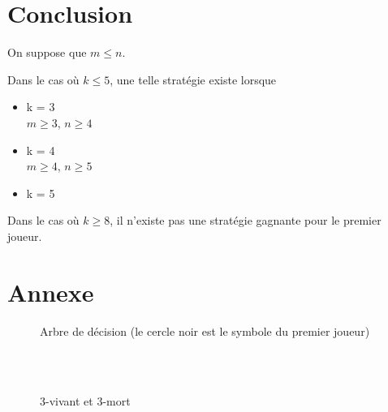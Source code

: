\documentclass{beamer}
\begin{document}
\section{Conclusion}
On suppose que $m \le n$.\par
Dans le cas où $k \le 5$, une telle stratégie existe lorsque
\begin{itemize}
    \item k = 3\\
        $m \ge 3$, $n \ge 4$
    \item k = 4\\
        $m \ge 4$, $n \ge 5$
    \item k = 5
\end{itemize}
\par
Dans le cas où $k \ge 8$, il n'existe pas une stratégie gagnante pour le premier joueur.

\section{Annexe}

\begin{figure}[h]
    \centering
    \cleargoban

    \caption{Arbre de décision (le cercle noir est le symbole du premier joueur)} \label{fig:arbre}
\end{figure}

\cleargoban

\begin{figure}[h]
    \centering
    \\
    \ \\
    \caption{3-vivant et 3-mort}
    \label{fig:vivmort}
\end{figure}
\end{document}
